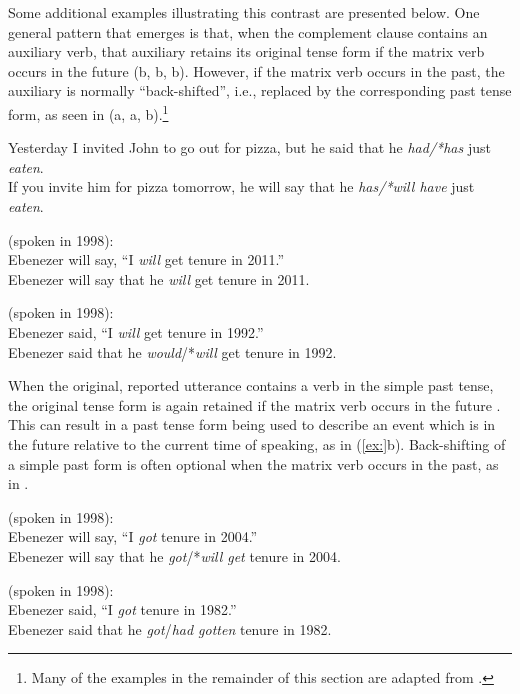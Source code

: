 Some additional examples illustrating this contrast are presented below. One general pattern that emerges is that, when the complement clause contains an auxiliary verb, that auxiliary retains its original tense form if the matrix verb occurs in the future (b, b, b). However, if the matrix verb occurs in the past, the auxiliary is normally “back-shifted”, i.e., replaced by the corresponding past tense form, as seen in (a, a, b).\footnote{Many of the examples in the remainder of this section are adapted from \citet{Declerck1991}.}


\ea
\ea Yesterday I invited John to go out for pizza, but he said that he \textit{had/*has} just \textit{eaten}.\\
\ex If you invite him for pizza tomorrow, he will say that he \textit{has/*will have} just \textit{eaten}.
                       \z
\z

\ea
(spoken in 1998):\\
 Ebenezer will say, “I \textit{will} get tenure in 2011.”\\
 Ebenezer will say that he \textit{will} get tenure in 2011.
                       \z
\z

\ea
(spoken in 1998):\\
 Ebenezer said, “I \textit{will} get tenure in 1992.”\\
 Ebenezer said that he \textit{would}/*\textit{will} get tenure in 1992.
                       \z
\z


When the original, reported utterance contains a verb in the simple past tense, the original tense form is again retained if the matrix verb occurs in the future . This can result in a past tense form being used to describe an event which is in the future relative to the current time of speaking, as in (\ref{ex:}b). Back-shifting of a simple past form is often optional when the matrix verb occurs in the past, as in .


\ea
(spoken in 1998):\\
 Ebenezer will say, “I \textit{got} tenure in 2004.”\\
 Ebenezer will say that he \textit{got}/*\textit{will get} tenure in 2004.
                       \z
\z

\ea
(spoken in 1998):\\
 Ebenezer said, “I \textit{got} tenure in 1982.”\\
 Ebenezer said that he \textit{got}/\textit{had gotten} tenure in 1982.
                       \z
\z


